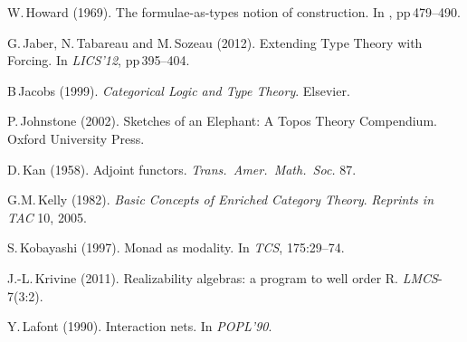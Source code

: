 \documentclass[11pt,twocolumn]{article}
\begin{document}
{\begin{thebibliography}{000}


W.\,Howard (1969).
\newblock The formulae-as-types notion of construction.
\newblock In \emph{\cite{ToHBCurry}}, pp\,479--490. 

G.\,Jaber, N.\,Tabareau and M.\,Sozeau (2012).
\newblock Extending Type Theory with Forcing.
\newblock In \emph{LICS'12}, pp\,395--404.

B\,Jacobs (1999).
\newblock \emph{Categorical Logic and Type Theory}.
\newblock Elsevier.

P.\,Johnstone (2002).
\newblock Sketches of an Elephant: A Topos Theory Compendium. 
\newblock Oxford University Press.



D.\,Kan (1958).
\newblock Adjoint functors.
\newblock \emph{Trans.\ Amer.\ Math.\ Soc.} 87.

G.M.\,Kelly (1982).
\newblock \emph{Basic Concepts of Enriched Category Theory}.
\newblock \emph{Reprints in TAC} 10, 2005.


S.\,Kobayashi (1997).
\newblock Monad as modality.
\newblock In \emph{TCS}, 175:29--74.

J.-L.\,Krivine (2011).
\newblock Realizability algebras: a program to well order R.
\newblock \emph{LMCS}-7(3:2).

Y.\,Lafont (1990).
\newblock Interaction nets.
\newblock In \emph{POPL'90}.


\end{thebibliography}}
\end{document}
